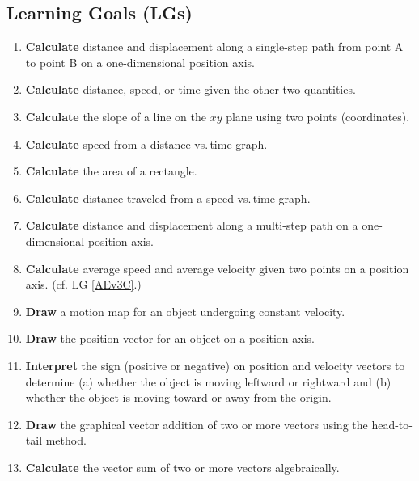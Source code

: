 \documentclass[dvipsnames]{article}
\begin{document}
\subsection*{Learning Goals (LGs)} %

\begin{enumerate}[itemsep=0pt,topsep=-3pt]
\item \label{56rfg} \textbf{Calculate} distance and displacement along a single-step path from point A to point B on a one-dimensional position axis.
\item \label{AEv3C} \textbf{Calculate} distance, speed, or time given the other two quantities.
\item \textbf{Calculate} the slope of a line on the $xy$ plane using two points (coordinates). 
\item \textbf{Calculate} speed from a distance vs.\,time graph.
\item \textbf{Calculate} the area of a rectangle.
\item \textbf{Calculate} distance traveled from a speed vs.\,time graph.
\item \textbf{Calculate} distance and displacement along a multi-step path on a one-dimensional position axis.
\item \textbf{Calculate} average speed and average velocity given two points on a position axis. (cf. LG \ref{AEv3C}.)
\item \textbf{Draw} a motion map for an object undergoing constant velocity.
\item \textbf{Draw} the position vector for an object on a position axis.
\item \textbf{Interpret} the sign (positive or negative) on position and velocity vectors to determine (a) whether the object is moving leftward or rightward and (b) whether the object is moving toward or away from the origin.
\item \label{HjHbZ} \textbf{Draw} the graphical vector addition of two or more vectors using the head-to-tail method.
\item \textbf{Calculate} the vector sum of two or more vectors algebraically.

\end{enumerate}
\end{document}
